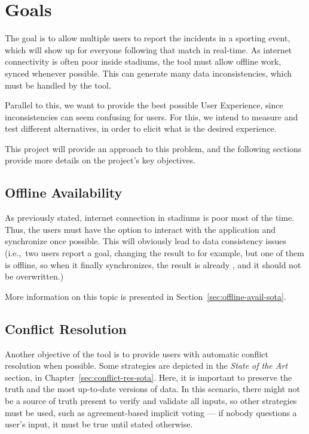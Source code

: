 \section{Goals}
The goal is to allow multiple users to report the incidents in a sporting event, which will show up for everyone following that match in real-time. As internet connectivity is often poor inside stadiums, the tool must allow offline work, synced whenever possible. This can generate many data inconsistencies, which must be handled by the tool.

Parallel to this, we want to provide the best possible User Experience, since inconsistencies can seem confusing for users. For this, we intend to measure and test different alternatives, in order to elicit what is the desired experience. 

This project will provide an approach to this problem, and the following sections provide more details on the project's key objectives.

\subsection*{Offline Availability} \label{sec:offline-avail-intro}

As previously stated, internet connection in stadiums is poor most of the time. Thus, the users must have the option to interact with the application and synchronize once possible. This will obviously lead to data consistency issues (i.e.,\ two users report a goal, changing the result to  for example, but one of them is offline, so when it finally synchronizes, the result is already , and it should not be overwritten.)

More information on this topic is presented in Section~\ref{sec:offline-avail-sota}.

\subsection*{Conflict Resolution} \label{sec:conflict-res-intro}

Another objective of the tool is to provide users with automatic conflict resolution when possible. Some strategies are depicted in the \textit{State of the Art} section, in Chapter~\ref{sec:conflict-res-sota}. Here, it is important to preserve the truth and the most up-to-date versions of data. In this scenario, there might not be a source of truth present to verify and validate all inputs, so other strategies must be used, such as agreement-based implicit voting --- if nobody questions a user's input, it must be true until stated otherwise.

